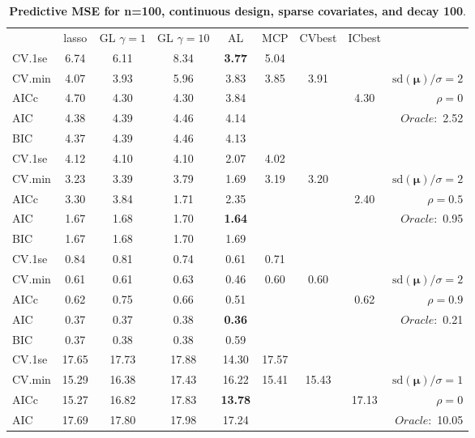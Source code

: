 \clearpage
\begin{table}\vspace{-.5cm}
\caption[l]{ { \bf Predictive MSE for n=100, continuous design, 
sparse covariates, and  decay  100}.}
\vspace{-.5cm}
\footnotesize{}
\begin{center}
\begin{tabular}{l*{7}{c}|r}
 & lasso & GL $\gamma=1$ & GL $\gamma=10$ & AL & MCP  & CVbest & ICbest  \\
\cline{1-9}
CV.1se & 6.74 & 6.11 & 8.34 & {\bf 3.77} & 5.04 & & & \\
CV.min & 4.07 & 3.93 & 5.96 & 3.83 & 3.85 & 3.91 & & $\mathrm{sd}(\mathbf{\mu})/\sigma=2$ \\
AICc & 4.70 & 4.30 & 4.30 & 3.84 & & & 4.30 &  $\rho=0$ \\
AIC & 4.38 & 4.39 & 4.46 & 4.14 & & & &  \multirow{2}{*}{$Oracle: $ 2.52} \\
BIC & 4.37 & 4.39 & 4.46 & 4.13 & & & &  \\
 \hline 
CV.1se & 4.12 & 4.10 & 4.10 & 2.07 & 4.02 & & & \\
CV.min & 3.23 & 3.39 & 3.79 & 1.69 & 3.19 & 3.20 & & $\mathrm{sd}(\mathbf{\mu})/\sigma=2$ \\
AICc & 3.30 & 3.84 & 1.71 & 2.35 & & & 2.40 &  $\rho=0.5$ \\
AIC & 1.67 & 1.68 & 1.70 & {\bf 1.64} & & & &  \multirow{2}{*}{$Oracle: $ 0.95} \\
BIC & 1.67 & 1.68 & 1.70 & 1.69 & & & &  \\
 \hline 
CV.1se & 0.84 & 0.81 & 0.74 & 0.61 & 0.71 & & & \\
CV.min & 0.61 & 0.61 & 0.63 & 0.46 & 0.60 & 0.60 & & $\mathrm{sd}(\mathbf{\mu})/\sigma=2$ \\
AICc & 0.62 & 0.75 & 0.66 & 0.51 & & & 0.62 &  $\rho=0.9$ \\
AIC & 0.37 & 0.37 & 0.38 & {\bf 0.36} & & & &  \multirow{2}{*}{$Oracle: $ 0.21} \\
BIC & 0.37 & 0.38 & 0.38 & 0.59 & & & &  \\
 \hline 
CV.1se & 17.65 & 17.73 & 17.88 & 14.30 & 17.57 & & & \\
CV.min & 15.29 & 16.38 & 17.43 & 16.22 & 15.41 & 15.43 & & $\mathrm{sd}(\mathbf{\mu})/\sigma=1$ \\
AICc & 15.27 & 16.82 & 17.83 & {\bf 13.78} & & & 17.13 &  $\rho=0$ \\
AIC & 17.69 & 17.80 & 17.98 & 17.24 & & & &  \multirow{2}{*}{$Oracle: $ 10.05} \\

\end{tabular}
\end{center}
\end{table}
